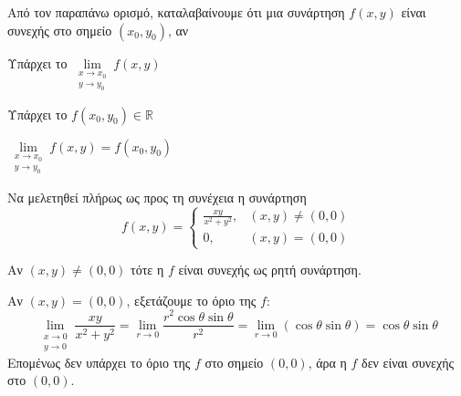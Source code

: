 

\begin{rem}
  Από τον παραπάνω ορισμό, καταλαβαίνουμε ότι μια συνάρτηση $ f(x,y) $ 
  είναι συνεχής στο σημείο $ (x_{0}, y_{0}) $, αν
  \begin{myitemize}
    \item Υπάρχει το $ \lim\limits_{\substack{x\to x_{0} \\y \to y_{0}}} f(x,y) $
    \item Υπάρχει το $ f(x_{0}, y_{0}) \in \mathbb{R} $
    \item $  \lim\limits_{\substack{x\to x_{0} \\ y \to y_{0}}} f(x,y) = 
      f(x_{0}, y_{0}) $
  \end{myitemize}
\end{rem}

\begin{example}
  Να μελετηθεί πλήρως ως προς τη συνέχεια η συνάρτηση 
  \[
    f(x,y) = 
    \begin{cases} 
      \frac{xy}{x^{2}+y^{2}}, & (x,y) \neq (0,0) \\ 
      0, & (x,y) = (0,0) 
    \end{cases}  
  \]
  \begin{solution}
  \item {}              
    Αν $ (x,y) \neq (0,0) $ τότε η $f$ είναι συνεχής 
    ως ρητή συνάρτηση.

    Αν $ (x,y)=(0,0) $, εξετάζουμε το όριο της $f$: 
    \[
      \lim\limits_{\substack{x\to 0 \\y \to 0}} \frac{xy}{x^{2}+y^{2}} = 
      \lim_{r \to 0} \frac{r^{2} \cos{\theta} \sin{\theta} }{ r^{2}} = 
      \lim_{r \to 0}(\cos{\theta} \sin{\theta}) = \cos{\theta} \sin{\theta} 
    \] 
    Επομένως δεν υπάρχει το όριο της $f$ στο σημείο $ (0,0) $, άρα η $f$ 
    δεν είναι συνεχής στο $ (0,0) $.
  \end{solution}
\end{example}

